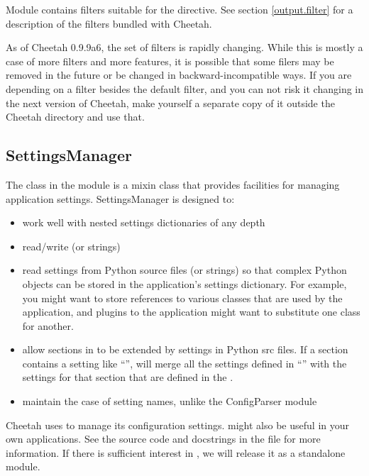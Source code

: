 Module  contains filters suitable for the 
directive.  See section \ref{output.filter} for a description of the
filters bundled with Cheetah.

As of Cheetah 0.9.9a6, the set of filters is rapidly changing.  While this is
mostly a case of more filters and more features, it is possible that some 
filers may be removed in the future or be changed in backward-incompatible ways.
If you are depending on a filter besides the default filter, and you can not
risk it changing in the next version of Cheetah, make yourself a separate copy
of it outside the Cheetah directory and use that.

\subsection{SettingsManager}
\label{libraries.SettingsManager}

The  class in the  module is
a mixin class that provides facilities for managing application settings.  
SettingsManager is designed to:
\begin{itemize}
\item work well with nested settings dictionaries of any depth
\item read/write  (or strings)
\item read settings from Python source files (or strings) so that
     complex Python objects can be stored in the application's settings
     dictionary.  For example, you might want to store references to various
     classes that are used by the application, and plugins to the application
     might want to substitute one class for another.
\item allow sections in  to be extended by settings in
     Python src files.  If a section contains a setting like
     ``'',  will merge
     all the settings defined in ``'' with the settings for
     that section that are defined in the .
\item maintain the case of setting names, unlike the ConfigParser module
\end{itemize}

Cheetah uses  to manage its configuration settings.
 might also be useful in your own applications. See the
source code and docstrings in the file  for more
information. If there is sufficient interest in , we will
release it as a standalone module.

